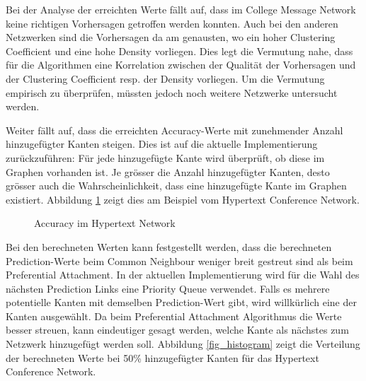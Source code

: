 Bei der Analyse der erreichten Werte fällt auf, dass im College Message Network keine richtigen Vorhersagen getroffen werden konnten.
Auch bei den anderen Netzwerken sind die Vorhersagen da am genausten, wo ein hoher Clustering Coefficient und eine hohe Density vorliegen.
Dies legt die Vermutung nahe, dass für die Algorithmen eine Korrelation zwischen der Qualität der Vorhersagen und der Clustering Coefficient resp. der Density vorliegen.
Um die Vermutung empirisch zu überprüfen, müssten jedoch noch weitere Netzwerke untersucht werden.

Weiter fällt auf, dass die erreichten Accuracy-Werte mit zunehmender Anzahl hinzugefügter Kanten steigen.
Dies ist auf die aktuelle Implementierung zurückzuführen: Für jede hinzugefügte Kante wird überprüft, ob diese im Graphen vorhanden ist.
Je grösser die Anzahl hinzugefügter Kanten, desto grösser auch die Wahrscheinlichkeit, dass eine hinzugefügte Kante im Graphen existiert.
Abbildung \ref{fig_hypertext} zeigt dies am Beispiel vom Hypertext Conference Network.

\begin{figure}[h]
\centering
{}
\label{fig_hypertext}
\caption{Accuracy im Hypertext Network}
\end{figure}

Bei den berechneten Werten kann festgestellt werden, dass die berechneten Prediction-Werte beim Common Neighbour weniger breit gestreut sind als beim Preferential Attachment.
In der aktuellen Implementierung wird für die Wahl des nächsten Prediction Links eine Priority Queue verwendet. Falls es mehrere potentielle Kanten mit demselben Prediction-Wert gibt, wird willkürlich eine der Kanten ausgewählt.
Da beim Preferential Attachment Algorithmus die Werte besser streuen, kann eindeutiger gesagt werden, welche Kante als nächstes zum Netzwerk hinzugefügt werden soll.
Abbildung \ref{fig_histogram}
zeigt die Verteilung der berechneten Werte bei 50\% hinzugefügter Kanten für das Hypertext Conference Network.

